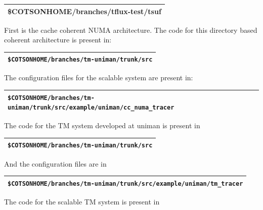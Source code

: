\documentclass[a4paper]{article}
\begin{document}
\begin{flushleft}
\tablehead{}
\begin{supertabular}{|m{6.29346in}|}
\hline
{}\ttfamily
\$COTSONHOME/branches/tflux-test/tsuf\\\hline
\end{supertabular}
\end{flushleft}
{
First is the cache coherent NUMA architecture. The code for this
directory based coherent architecture is present in:}

\begin{flushleft}
\tablehead{}
\begin{supertabular}{|m{6.29346in}|}
\hline
{}
\texttt{\$COTSONHOME/branches/tm-uniman/trunk/src}\\\hline
\end{supertabular}
\end{flushleft}
{
The configuration files for the scalable system are present in:}

\begin{flushleft}
\tablehead{}
\begin{supertabular}{|m{6.29346in}|}
\hline
{}
\texttt{\$COTSONHOME/branches/tm-uniman/trunk/src/example/uniman/cc\_numa\_tracer}\\\hline
\end{supertabular}
\end{flushleft}
{
The code for the TM system developed at uniman is present in}

\begin{flushleft}
\tablehead{}
\begin{supertabular}{|m{6.29346in}|}
\hline
{}
\texttt{\$COTSONHOME/branches/tm-uniman/trunk/src}\\\hline
\end{supertabular}
\end{flushleft}
{
And the configuration files are in}

\begin{flushleft}
\tablehead{}
\begin{supertabular}{|m{6.29346in}|}
\hline
{}
\texttt{\$COTSONHOME/branches/tm-uniman/trunk/src/example/uniman/tm\_tracer}\\\hline
\end{supertabular}
\end{flushleft}
{
The code for the scalable TM system is present in}
\end{document}
